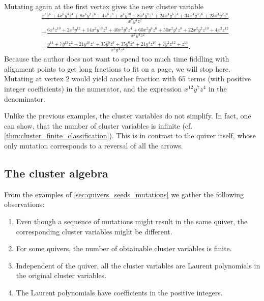 \begin{example}
\begin{align*}
	\end{align*}
	Mutating again at the first vertex gives the new cluster variable
	\begin{align*}
		 & \frac{x^{8} z^{6} + 4 x^{6} y^{4} z^{4} + 8 x^{6} y^{2} z^{6} + 4 x^{6} z^{8} + x^{4} y^{10} + 8 x^{4} y^{8} z^{2} + 24 x^{4} y^{6} z^{4} + 34 x^{4} y^{4} z^{6} + 23 x^{4} y^{2} z^{8}}{x^7y^4z^2} \\&+ \frac{6 x^{4} z^{10} + 2 x^{2} y^{12} + 14 x^{2} y^{10} z^{2} + 40 x^{2} y^{8} z^{4} + 60 x^{2} y^{6} z^{6} + 50 x^{2} y^{4} z^{8} + 22 x^{2} y^{2} z^{10} + 4 x^{2} z^{12}}{x^7 y^4 z^2}\\ &+ \frac{y^{14} + 7 y^{12} z^{2} + 21 y^{10} z^{4} + 35 y^{8} z^{6} + 35 y^{6} z^{8} + 21 y^{4} z^{10} + 7 y^{2} z^{12} + z^{14}}{x^{7} y^{4} z^{2}}.
	\end{align*}
	Because the author does not want to spend too much time fiddling with alignment points
	to get long fractions to fit on a page, we will stop here. Mutating at vertex 2 would
	yield another fraction with 65 terms (with positive integer coefficients) in the
	numerator, and the expression $x^{12}y^7z^4$ in the denominator.

	Unlike the previous examples, the cluster variables do not simplify. In fact, one can
	show, that the number of cluster variables is infinite (cf.
	\cref{thm:cluster_finite_classification}). This is in contrast to the quiver itself,
	whose only mutation corresponds to a reversal of all the arrows.
\end{example}

\subsection{The cluster algebra}

From the examples of \cref{sec:quivers_seeds_mutations} we gather the following
observations:
\begin{enumerate}
	\item Even though a sequence of mutations might result in the same quiver, the corresponding
	      cluster variables might be different.
	\item For some quivers, the number of obtainable cluster variables is finite.
	\item Independent of the quiver, all the cluster variables are Laurent polynomials in the
	      original cluster variables.
	\item The Laurent polynomials have coefficients in the positive integers.
\end{enumerate}

